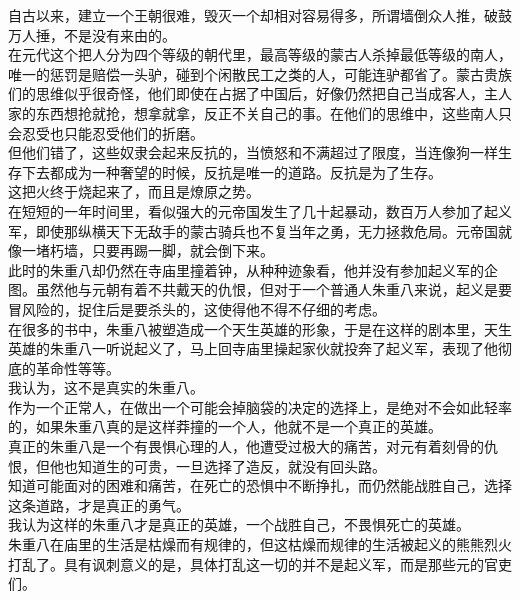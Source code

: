 \begin{multicols}{\theparacolNo}
自古以来，建立一个王朝很难，毁灭一个却相对容易得多，所谓墙倒众人推，破鼓万人捶，不是没有来由的。\\

在元代这个把人分为四个等级的朝代里，最高等级的蒙古人杀掉最低等级的南人，唯一的惩罚是赔偿一头驴，碰到个闲散民工之类的人，可能连驴都省了。蒙古贵族们的思维似乎很奇怪，他们即使在占据了中国后，好像仍然把自己当成客人，主人家的东西想抢就抢，想拿就拿，反正不关自己的事。在他们的思维中，这些南人只会忍受也只能忍受他们的折磨。\\

但他们错了，这些奴隶会起来反抗的，当愤怒和不满超过了限度，当连像狗一样生存下去都成为一种奢望的时候，反抗是唯一的道路。反抗是为了生存。\\

这把火终于烧起来了，而且是燎原之势。\\

在短短的一年时间里，看似强大的元帝国发生了几十起暴动，数百万人参加了起义军，即使那纵横天下无敌手的蒙古骑兵也不复当年之勇，无力拯救危局。元帝国就像一堵朽墙，只要再踢一脚，就会倒下来。\\

此时的朱重八却仍然在寺庙里撞着钟，从种种迹象看，他并没有参加起义军的企图。虽然他与元朝有着不共戴天的仇恨，但对于一个普通人朱重八来说，起义是要冒风险的，捉住后是要杀头的，这使得他不得不仔细的考虑。\\

在很多的书中，朱重八被塑造成一个天生英雄的形象，于是在这样的剧本里，天生英雄的朱重八一听说起义了，马上回寺庙里操起家伙就投奔了起义军，表现了他彻底的革命性等等。\\

我认为，这不是真实的朱重八。\\

作为一个正常人，在做出一个可能会掉脑袋的决定的选择上，是绝对不会如此轻率的，如果朱重八真的是这样莽撞的一个人，他就不是一个真正的英雄。\\

真正的朱重八是一个有畏惧心理的人，他遭受过极大的痛苦，对元有着刻骨的仇恨，但他也知道生的可贵，一旦选择了造反，就没有回头路。\\

知道可能面对的困难和痛苦，在死亡的恐惧中不断挣扎，而仍然能战胜自己，选择这条道路，才是真正的勇气。\\

我认为这样的朱重八才是真正的英雄，一个战胜自己，不畏惧死亡的英雄。\\

朱重八在庙里的生活是枯燥而有规律的，但这枯燥而规律的生活被起义的熊熊烈火打乱了。具有讽刺意义的是，具体打乱这一切的并不是起义军，而是那些元的官吏们。\\


\end{multicols}
